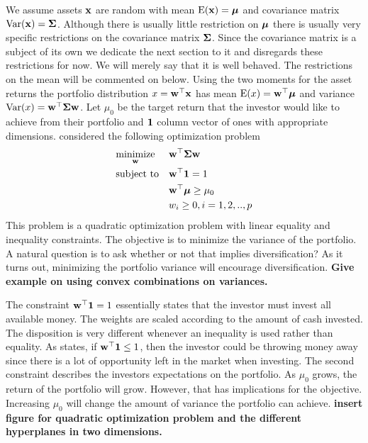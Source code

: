 \documentclass[]{book}
\begin{document}
We assume assets $\mathbf{x}$ are random with mean $\operatorname{E}(\mathbf{x})=\mbox{\boldmath$\mu$}$ and covariance matrix $\operatorname{Var}(\mathbf{x})=\mathbf{\Sigma}$. Although there is usually little restriction on $\mbox{\boldmath$\mu$}$ there is usually very specific restrictions on the covariance matrix $\mathbf{\Sigma}$. Since the covariance matrix is a subject of its own we dedicate the next section to it and disregards these restrictions for now. We will merely say that it is well behaved. The restrictions on the mean will be commented on below. Using the two moments for the asset returns the portfolio distribution $x = \mathbf{w}^\top \mathbf{x}$ has mean $\operatorname{E}(x)=\mathbf{w}^\top \mbox{\boldmath$\mu$}$ and variance $\operatorname{Var}(x)=\mathbf{w}^\top \mathbf{\Sigma} \mathbf{w}$. Let $\mu_0$ be the target return that the investor would like to achieve from their portfolio and $\mathbf{1}$ column vector of ones with appropriate dimensions. \citet{markowitz1959portfolio} considered the following optimization problem
\begin{equation}\label{eqn:markowitz_optim}
\begin{aligned}
& \underset{\mathbf{w}}{\text{minimize}} 
& & \mathbf{w}^\top \mathbf{\Sigma} \mathbf{w} \\
& \text{subject to}
& & \mathbf{w}^\top \mathbf{1} = 1 \\
& && \mathbf{w}^\top \mbox{\boldmath$\mu$} \geq \mu_0 \\
&&& w_i \geq 0, i=1,2,..,p
\end{aligned}
\end{equation}
This problem is a quadratic optimization problem with linear equality and inequality constraints. 
The objective is to minimize the variance of the portfolio. 
A natural question is to ask whether or not that implies diversification? As it turns out, minimizing the portfolio variance will encourage diversification.
\textbf{Give example on using convex combinations on variances.} 
 
The constraint $\mathbf{w}^\top \mathbf{1} = 1$ essentially states that the investor must invest all available money. 
The weights are scaled according to the amount of cash invested.
The disposition is very different whenever an inequality is used rather than equality. 
As \citet{hult2012risk} states, if $\mathbf{w}^\top \mathbf{1} \leq 1$, then the investor could be throwing money away since there is a lot of opportunity left in the market when investing.
The second constraint describes the investors expectations on the portfolio. 
As $\mu_0$ grows, the return of the portfolio will grow. 
However, that has implications for the objective. 
Increasing $\mu_0$ will change the amount of variance the portfolio can achieve. 
\textbf{insert figure for quadratic optimization problem and the different hyperplanes in two dimensions.}
\end{document}

